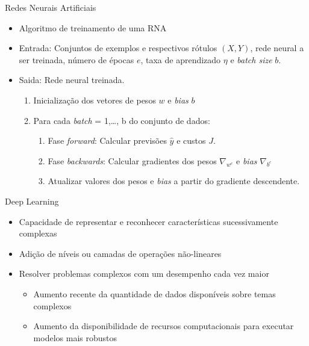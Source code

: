 \begin{frame}{Redes Neurais Artificiais}
   \ \  \\[0.1cm]
  \begin{itemize}
  \item Algoritmo de treinamento de uma RNA
  \item Entrada: Conjuntos de exemplos e respectivos rótulos $(X,Y)$, rede neural a ser treinada, número de épocas $e$, taxa de aprendizado $\eta$ e \emph{batch size} $b$.
  \item Saida: Rede neural treinada.
  \begin{enumerate}

    \item Inicialização dos vetores de pesos $w$ e \emph{bias} $b$
    \item Para cada \emph{batch} = 1,\ldots, b do conjunto de dados:
    \begin{enumerate}
      \item Fase \emph{forward}: Calcular previsões $\hat{y}$ e custos $J$.
      \item Fase \emph{backwards}: Calcular gradientes dos pesos $\nabla_{w^c}$ e \emph{bias} $\nabla_{b^c}$
      \item Atualizar valores dos pesos e \emph{bias} a partir do gradiente descendente.
    \end{enumerate}
  \end{enumerate}
\end{itemize}
\end{frame}

\begin{frame}{Deep Learning}
   \ \  \\[0.1cm]
   \begin{itemize}
     \item Capacidade de representar e reconhecer características sucessivamente complexas
     \item Adição de níveis ou camadas de operações não-lineares
     \item Resolver problemas complexos com um desempenho cada vez maior
     \begin{itemize}
       \item Aumento recente da quantidade de dados disponíveis sobre temas complexos
       \item Aumento da disponibilidade de recursos computacionais para executar modelos mais robustos
     \end{itemize}
   \end{itemize}
\end{frame}

